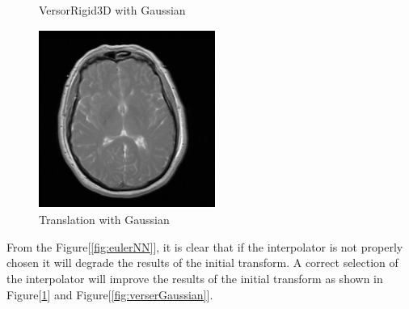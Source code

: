 \documentclass[11pt,english]{article}
\begin{document}
\begin{figure}[h!]
\begin{minipage}[b]{0.3\textwidth}
          \caption{VersorRigid3D with Gaussian}
          \label{fig:verserGaussian}
        \end{minipage}
        \begin{minipage}[b]{0.3\textwidth}
            \includegraphics[width = \textwidth]{images/translationGaussian.PNG}
            \caption{Translation with Gaussian}
            \label{fig:translationGaussian}
          \end{minipage}
      \end{figure}
From the Figure[\ref{fig:eulerNN}], it is clear that if the interpolator is not properly chosen it will degrade the results of the initial transform. A correct selection of the interpolator will improve the results of the initial transform as shown in Figure[\ref{fig:translationGaussian}] and Figure[\ref{fig:verserGaussian}].    
\end{document}
